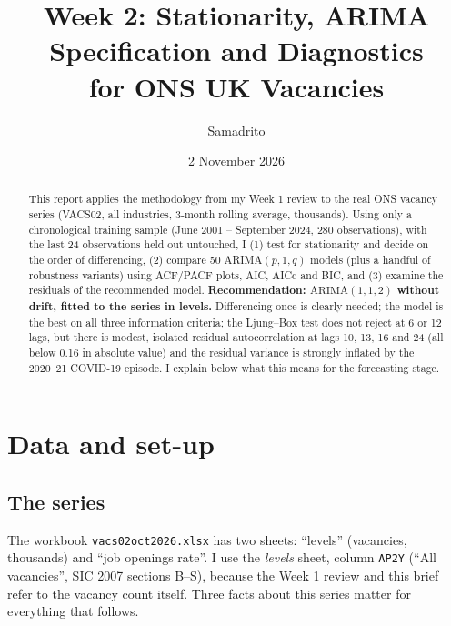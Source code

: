 \documentclass[11pt,a4paper]{article}
\title{\textbf{Week 2: Stationarity, ARIMA Specification and Diagnostics\\for ONS UK Vacancies}}
\author{Samadrito}
\date{2 November 2026}
\newcommand{\ARIMA}[3]{\mathrm{ARIMA}(#1,#2,#3)}
\begin{document}
\maketitle

\begin{abstract}
\noindent This report applies the methodology from my Week 1 review to the real ONS vacancy series (VACS02, all industries, 3-month rolling average, thousands). Using only a chronological training sample (June 2001 -- September 2024, 280 observations), with the last 24 observations held out untouched, I (1) test for stationarity and decide on the order of differencing, (2) compare 50 ARIMA$(p,1,q)$ models (plus a handful of robustness variants) using ACF/PACF plots, AIC, AICc and BIC, and (3) examine the residuals of the recommended model. \textbf{Recommendation: $\ARIMA{1}{1}{2}$ without drift, fitted to the series in levels.} Differencing once is clearly needed; the model is the best on all three information criteria; the Ljung--Box test does not reject at 6 or 12 lags, but there is modest, isolated residual autocorrelation at lags 10, 13, 16 and 24 (all below 0.16 in absolute value) and the residual variance is strongly inflated by the 2020--21 COVID-19 episode. I explain below what this means for the forecasting stage.
\end{abstract}

\tableofcontents

\section{Data and set-up}
\subsection{The series}
The workbook \texttt{vacs02oct2026.xlsx} has two sheets: ``levels'' (vacancies, thousands) and ``job openings rate''. I use the \emph{levels} sheet, column \texttt{AP2Y} (``All vacancies'', SIC 2007 sections B--S), because the Week 1 review and this brief refer to the vacancy count itself. Three facts about this series matter for everything that follows.
\end{document}
